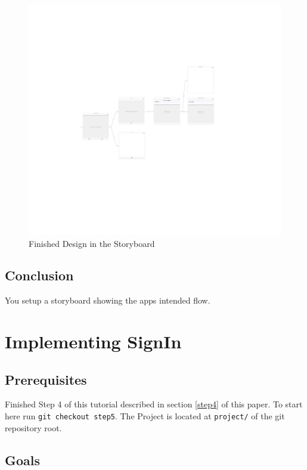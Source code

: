 \documentclass{article}
\begin{document}
\begin{figure}[H]
\centering
\includegraphics[width=\linewidth]{resources/step4/end-result.png}
\caption{Finished Design in the Storyboard}
\label{fig:storyboard-finished}
\end{figure}

\subsection{Conclusion}\label{step4:conclusion}

You setup a storyboard showing the apps intended flow.

\section{Implementing SignIn}\label{step5}

\subsection{Prerequisites}\label{step5:prerequisites}
Finished Step 4 of this tutorial described in section \ref{step4} of this paper.
To start here run \texttt{git checkout step5}.
The Project is located at \texttt{project/} of the git repository root.

\subsection{Goals}\label{step5:goals}
\end{document}
